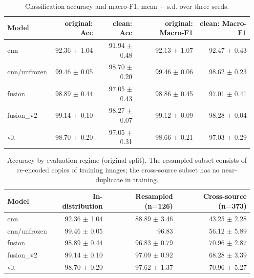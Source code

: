 \begin{table}[t]
\centering
\begin{tabular}{lrrrr}
\toprule
Model & original: Acc & clean: Acc & original: Macro-F1 & clean: Macro-F1 \\
\midrule
cnn & 92.36 $\pm$ 1.04 & 91.94 $\pm$ 0.48 & 92.13 $\pm$ 1.07 & 92.47 $\pm$ 0.43 \\
cnn/unfrozen & 99.46 $\pm$ 0.05 & 98.70 $\pm$ 0.20 & 99.46 $\pm$ 0.06 & 98.62 $\pm$ 0.23 \\
fusion & 98.89 $\pm$ 0.44 & 97.05 $\pm$ 0.43 & 98.86 $\pm$ 0.45 & 97.01 $\pm$ 0.41 \\
fusion_v2 & 99.14 $\pm$ 0.10 & 98.27 $\pm$ 0.07 & 99.12 $\pm$ 0.09 & 98.28 $\pm$ 0.04 \\
vit & 98.70 $\pm$ 0.20 & 97.05 $\pm$ 0.31 & 98.66 $\pm$ 0.21 & 97.03 $\pm$ 0.29 \\
\bottomrule
\end{tabular}
\caption{Classification accuracy and macro-F1, mean $\pm$ s.d. over three seeds.}
\label{tab:main}
\end{table}

\begin{table}[t]
\centering
\begin{tabular}{lrrr}
\toprule
Model & In-distribution & Resampled (n=126) & Cross-source (n=373) \\
\midrule
cnn & 92.36 $\pm$ 1.04 & 88.89 $\pm$ 3.46 & 43.25 $\pm$ 2.28 \\
cnn/unfrozen & 99.46 $\pm$ 0.05 & 96.83 & 56.12 $\pm$ 5.89 \\
fusion & 98.89 $\pm$ 0.44 & 96.83 $\pm$ 0.79 & 70.96 $\pm$ 2.87 \\
fusion_v2 & 99.14 $\pm$ 0.10 & 97.09 $\pm$ 0.92 & 68.28 $\pm$ 3.39 \\
vit & 98.70 $\pm$ 0.20 & 97.62 $\pm$ 1.37 & 70.96 $\pm$ 5.27 \\
\bottomrule
\end{tabular}
\caption{Accuracy by evaluation regime (original split). The resampled subset consists of re-encoded copies of training images; the cross-source subset has no near-duplicate in training.}
\label{tab:regimes_original}
\end{table}

